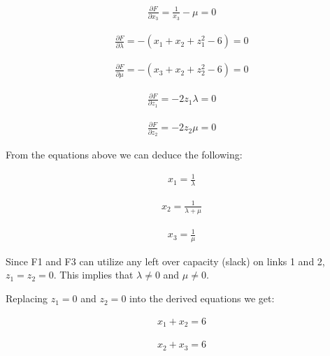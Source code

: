 \documentclass{article}
\def\pd#1#2{\frac{\partial#1}{\partial#2}}   %
\begin{document}
\begin{enumerate}
\begin{itemize}
\begin{eqnarray*}
\pd{F}{x_3} = {\frac {1}{x_3}} - \mu = 0
\end{eqnarray*}

\begin{eqnarray*}
\pd{F}{\lambda} = -(x_1 + x_2 + z_1^2 - 6) = 0
\end{eqnarray*}

\begin{eqnarray*}
\pd{F}{\mu} = -(x_3 + x_2 + z_2^2 - 6) = 0
\end{eqnarray*}

\begin{eqnarray*}
\pd{F}{z_1} = -2z_1\lambda = 0
\end{eqnarray*}

\begin{eqnarray*}
\pd{F}{z_2} = -2z_2\mu = 0
\end{eqnarray*}

\noindent From the equations above we can deduce the following:

\vspace{-3mm}

\begin{eqnarray*}
x_1 = {\frac{1}{\lambda}}
\end{eqnarray*}

\vspace{-3mm}

\begin{eqnarray*}
x_2 = {\frac{1}{\lambda + \mu}}
\end{eqnarray*}

\vspace{-3mm}

\begin{eqnarray*}
x_3 = {\frac{1}{\mu}}
\end{eqnarray*}

\noindent Since F1 and F3 can utilize any left over capacity
(slack) on links 1 and 2, $z_1 = z_2 = 0$. This implies that
$\lambda \ne 0$ and $\mu \ne 0$. \bigbreak

\noindent Replacing $z_1 = 0$ and $z_2 = 0$ into the derived
equations we get:

\vspace{-3mm}

\begin{eqnarray*}
x_1 + x_2 = 6
\end{eqnarray*}

\vspace{-3mm}

\begin{eqnarray*}
x_2 + x_3 = 6
\end{eqnarray*}


\end{itemize}
\end{enumerate}
\end{document}

